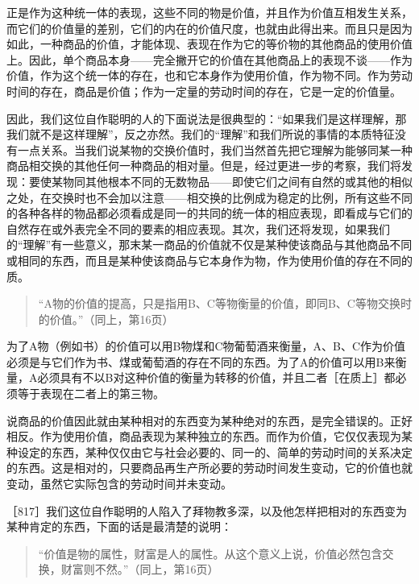 正是作为这种统一体的表现，这些不同的物是价值，并且作为价值互相发生关系，而它们的价值量的差别，它们的内在的价值尺度，也就由此得出来。而且只是因为如此，一种商品的价值，才能体现、表现在作为它的等价物的其他商品的使用价值上。因此，单个商品本身——完全撇开它的价值在其他商品上的表现不谈——作为价值，作为这个统一体的存在，也和它本身作为使用价值，作为物不同。作为劳动时间的存在，商品是价值；作为一定量的劳动时间的存在，它是一定的价值量。

因此，我们这位自作聪明的人的下面说法是很典型的：“如果我们是这样理解，那我们就不是这样理解”，反之亦然。我们的“理解”和我们所说的事情的本质特征没有一点关系。当我们说某物的交换价值时，我们当然首先把它理解为能够同某一种商品相交换的其他任何一种商品的相对量。但是，经过更进一步的考察，我们将发现：要使某物同其他根本不同的无数物品——即使它们之间有自然的或其他的相似之处，在交换时也不会加以注意——相交换的比例成为稳定的比例，所有这些不同的各种各样的物品都必须看成是同一的共同的统一体的相应表现，即看成与它们的自然存在或外表完全不同的要素的相应表现。其次，我们还将发现，如果我们的“理解”有一些意义，那末某一商品的价值就不仅是某种使该商品与其他商品不同或相同的东西，而且是某种使该商品与它本身作为物，作为使用价值的存在不同的质。

\begin{quote}{“A物的价值的提高，只是指用B、C等物衡量的价值，即同B、C等物交换时的价值。”（同上，第16页）}\end{quote}

为了A物（例如书）的价值可以用B物煤和C物葡萄酒来衡量，A、B、C作为价值必须是与它们作为书、煤或葡萄酒的存在不同的东西。为了A的价值可以用B来衡量，A必须具有不以B对这种价值的衡量为转移的价值，并且二者［在质上］都必须等于表现在二者上的第三物。

说商品的价值因此就由某种相对的东西变为某种绝对的东西，是完全错误的。正好相反。作为使用价值，商品表现为某种独立的东西。而作为价值，它仅仅表现为某种设定的东西，某种仅仅由它与社会必要的、同一的、简单的劳动时间的关系决定的东西。这是相对的，只要商品再生产所必要的劳动时间发生变动，它的价值也就变动，虽然它实际包含的劳动时间并未变动。

［817］我们这位自作聪明的人陷入了拜物教多深，以及他怎样把相对的东西变为某种肯定的东西，下面的话是最清楚的说明：

\begin{quote}{“价值是物的属性，财富是人的属性。从这个意义上说，价值必然包含交换，财富则不然。”（同上，第16页）}\end{quote}

